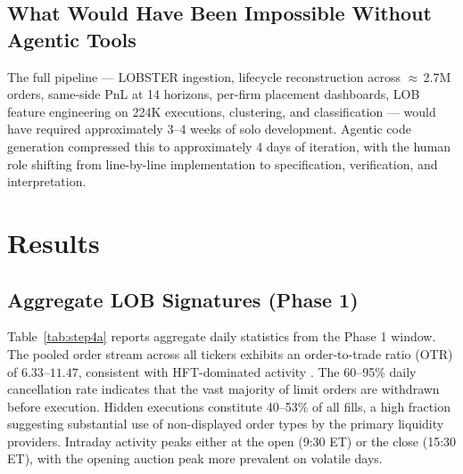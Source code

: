 \documentclass[11pt, letterpaper]{article}
\begin{document}
\subsection{What Would Have Been Impossible Without Agentic Tools}

The full pipeline --- LOBSTER ingestion, lifecycle reconstruction across
${\approx}$\,2.7M orders, same-side PnL at 14 horizons, per-firm placement
dashboards, LOB feature engineering on 224K executions, clustering, and
classification --- would have required approximately 3--4 weeks of solo
development.
Agentic code generation compressed this to approximately 4 days of iteration,
with the human role shifting from line-by-line implementation to specification,
verification, and interpretation.

\section{Results}

\subsection{Aggregate LOB Signatures (Phase 1)}

Table~\ref{tab:step4a} reports aggregate daily statistics from the Phase 1
window.
The pooled order stream across all tickers exhibits an order-to-trade ratio
(OTR) of $6.33$--$11.47$, consistent with HFT-dominated activity
\citep{Hasbrouck2013,Baron2019}.
The 60--95\% daily cancellation rate indicates that the vast majority of
limit orders are withdrawn before execution.
Hidden executions constitute 40--53\% of all fills, a high fraction
suggesting substantial use of non-displayed order types by the primary
liquidity providers.
Intraday activity peaks either at the open (9:30 ET) or the close (15:30 ET),
with the opening auction peak more prevalent on volatile days.
\end{document}
